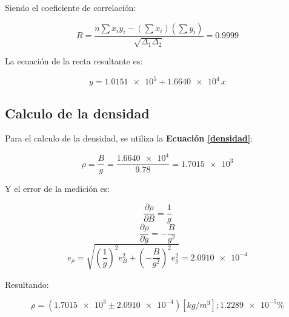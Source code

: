 \documentclass[letter,11pt]{article}
\begin{document}
Siendo el coeficiente de correlación:

\begin{equation*}
    R = \frac{n \sum x_i y_i - (\sum x_i)(\sum y_i)}{\sqrt{\Delta_1 \Delta_2}}
      = 0.9999
\end{equation*}
\vspace{0.10cm}

La ecuación de la recta resultante es:

\begin{equation*}
    y = \num{1.0151e5} + \num{1.6640e4}\,x
\end{equation*}
\vspace{0.10cm}

\subsection{Calculo de la densidad}

Para el calculo de la densidad, se utiliza la
\textbf{Ecuación \ref{densidad}}:

\begin{equation*}
    \rho = \frac{B}{g} = \frac{\num{1.6640e4}}{9.78} = \num{1.7015e3}
\end{equation*}
\vspace{0.10cm}

Y el error de la medición es:

\begin{equation*}
    \frac{\partial \rho}{\partial B} = \frac{1}{g}
\end{equation*}
\begin{equation*}
    \frac{\partial \rho}{\partial g} = -\frac{B}{g^2}
\end{equation*}
\begin{equation*}
    e_{\rho} = \sqrt{ \left(\frac{1}{g} \right)^2 e_B^2 + \left(-\frac{B}{g^2} \right)^2 e_g^2 } = \num{2.0910e-4}
\end{equation*}
\vspace{0.10cm}

Resultando:

\begin{equation*}
    \rho = (\num{1.7015e3} \pm \num{2.0910e-4}) [kg/m^3]; \num{1.2289e-5}\%
\end{equation*}
\vspace{0.10cm}
\end{document}

